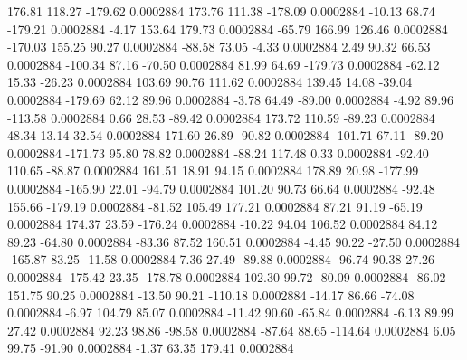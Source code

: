       176.81      118.27     -179.62     0.0002884
      173.76      111.38     -178.09     0.0002884
      -10.13       68.74     -179.21     0.0002884
       -4.17      153.64      179.73     0.0002884
      -65.79      166.99      126.46     0.0002884
     -170.03      155.25       90.27     0.0002884
      -88.58       73.05       -4.33     0.0002884
        2.49       90.32       66.53     0.0002884
     -100.34       87.16      -70.50     0.0002884
       81.99       64.69     -179.73     0.0002884
      -62.12       15.33      -26.23     0.0002884
      103.69       90.76      111.62     0.0002884
      139.45       14.08      -39.04     0.0002884
     -179.69       62.12       89.96     0.0002884
       -3.78       64.49      -89.00     0.0002884
       -4.92       89.96     -113.58     0.0002884
        0.66       28.53      -89.42     0.0002884
      173.72      110.59      -89.23     0.0002884
       48.34       13.14       32.54     0.0002884
      171.60       26.89      -90.82     0.0002884
     -101.71       67.11      -89.20     0.0002884
     -171.73       95.80       78.82     0.0002884
      -88.24      117.48        0.33     0.0002884
      -92.40      110.65      -88.87     0.0002884
      161.51       18.91       94.15     0.0002884
      178.89       20.98     -177.99     0.0002884
     -165.90       22.01      -94.79     0.0002884
      101.20       90.73       66.64     0.0002884
      -92.48      155.66     -179.19     0.0002884
      -81.52      105.49      177.21     0.0002884
       87.21       91.19      -65.19     0.0002884
      174.37       23.59     -176.24     0.0002884
      -10.22       94.04      106.52     0.0002884
       84.12       89.23      -64.80     0.0002884
      -83.36       87.52      160.51     0.0002884
       -4.45       90.22      -27.50     0.0002884
     -165.87       83.25      -11.58     0.0002884
        7.36       27.49      -89.88     0.0002884
      -96.74       90.38       27.26     0.0002884
     -175.42       23.35     -178.78     0.0002884
      102.30       99.72      -80.09     0.0002884
      -86.02      151.75       90.25     0.0002884
      -13.50       90.21     -110.18     0.0002884
      -14.17       86.66      -74.08     0.0002884
       -6.97      104.79       85.07     0.0002884
      -11.42       90.60      -65.84     0.0002884
       -6.13       89.99       27.42     0.0002884
       92.23       98.86      -98.58     0.0002884
      -87.64       88.65     -114.64     0.0002884
        6.05       99.75      -91.90     0.0002884
       -1.37       63.35      179.41     0.0002884
